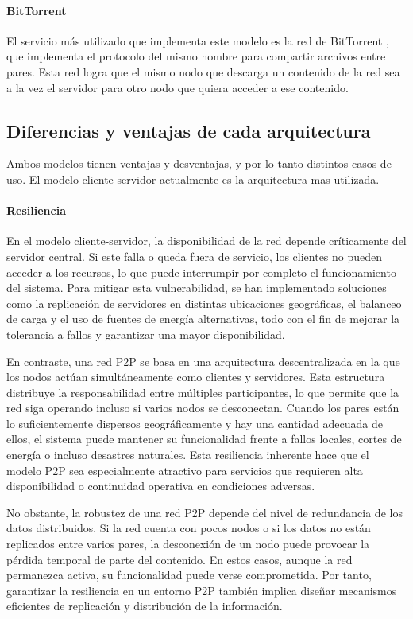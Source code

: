 \paragraph{BitTorrent} El servicio más utilizado que implementa este modelo es la red de BitTorrent \cite{bittorrent}, que implementa el protocolo del mismo nombre para compartir archivos entre pares. Esta red logra que el mismo nodo que descarga un contenido de la red sea a la vez el servidor para otro nodo que quiera acceder a ese contenido. 

\subsection{Diferencias y ventajas de cada arquitectura}
Ambos modelos tienen ventajas y desventajas, y por lo tanto distintos casos de uso. El modelo cliente-servidor actualmente es la arquitectura mas utilizada.

\paragraph{Resiliencia}

En el modelo cliente-servidor, la disponibilidad de la red depende críticamente del servidor central. Si este falla o queda fuera de servicio, los clientes no pueden acceder a los recursos, lo que puede interrumpir por completo el funcionamiento del sistema. Para mitigar esta vulnerabilidad, se han implementado soluciones como la replicación de servidores en distintas ubicaciones geográficas, el balanceo de carga \cite{bourke2001server} y el uso de fuentes de energía alternativas, todo con el fin de mejorar la tolerancia a fallos y garantizar una mayor disponibilidad.

En contraste, una red P2P se basa en una arquitectura descentralizada en la que los nodos actúan simultáneamente como clientes y servidores. Esta estructura distribuye la responsabilidad entre múltiples participantes, lo que permite que la red siga operando incluso si varios nodos se desconectan. Cuando los pares están lo suficientemente dispersos geográficamente y hay una cantidad adecuada de ellos, el sistema puede mantener su funcionalidad frente a fallos locales, cortes de energía o incluso desastres naturales. Esta resiliencia inherente hace que el modelo P2P sea especialmente atractivo para servicios que requieren alta disponibilidad o continuidad operativa en condiciones adversas.

No obstante, la robustez de una red P2P depende del nivel de redundancia de los datos distribuidos. Si la red cuenta con pocos nodos o si los datos no están replicados entre varios pares, la desconexión de un nodo puede provocar la pérdida temporal de parte del contenido. En estos casos, aunque la red permanezca activa, su funcionalidad puede verse comprometida. Por tanto, garantizar la resiliencia en un entorno P2P también implica diseñar mecanismos eficientes de replicación y distribución de la información.

